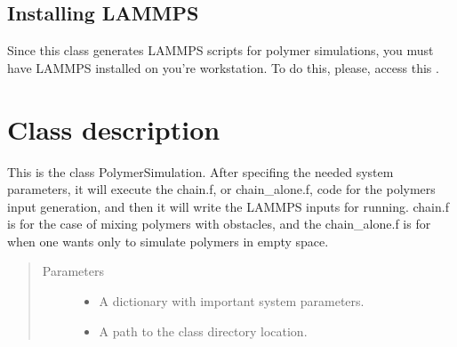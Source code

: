 \documentclass[letterpaper,10pt,english]{sphinxmanual}
\begin{document}
\begin{sphinxVerbatim}[commandchars=\\\{\}]
   
\end{sphinxVerbatim}


\subsection{Installing LAMMPS}
\label{\detokenize{getting_started:installing-lammps}}\label{\detokenize{getting_started:id4}}
Since this class generates LAMMPS scripts for polymer simulations, you must have LAMMPS installed on you’re workstation.
To do this, please, access this .


\section{Class description}
\label{\detokenize{class_description:module-lammps_generator}}\label{\detokenize{class_description:id1}}\label{\detokenize{class_description:class-description}}\label{\detokenize{class_description::doc}}

\begin{fulllineitems}
\label{\detokenize{class_description:lammps_generator.PolymerSimulation}}
This is the class PolymerSimulation. After specifing the needed system parameters,
it will execute the chain.f, or chain\_alone.f, code for the polymers input generation,
and then it will write the LAMMPS inputs for running. chain.f is for the case of mixing
polymers with obstacles, and the chain\_alone.f is for when one wants only to simulate
polymers in empty space.
\begin{quote}\begin{description}
\item[{Parameters}] \leavevmode\begin{itemize}
\item {} 
 \textendash{} A dictionary with important system parameters.

\item {} 
 \textendash{} A path to the class directory location.

\end{itemize}

\end{description}\end{quote}

\end{fulllineitems}
\end{document}
